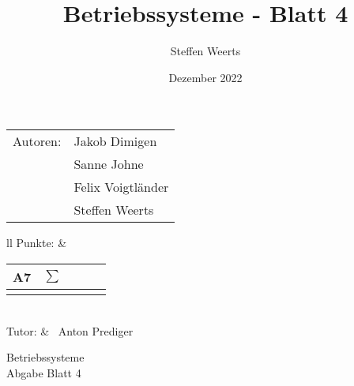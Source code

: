 \documentclass[12pt,a4paper,oneside,ngerman]{article}
\title{Betriebssysteme - Blatt 4}
\author{Steffen Weerts}
\date{Dezember 2022}
\newcommand{\fach}{Betriebssysteme}
\newcommand{\dokumentenTitel}{Abgabe Blatt 4}
\newcommand{\tutor}{Anton Prediger}
\newcommand{\memberOne}{Jakob Dimigen}
\newcommand{\memberTwo}{Sanne Johne}
\newcommand{\memberThree}{Felix Voigtl\"ander}
\newcommand{\memberFour}{Steffen Weerts}
\begin{document}
\thispagestyle{plain}

\begin{multicols}{2} %
		\hspace{-1cm} %
		\begin{tabular}{ll} %
			Autoren: & \memberOne \\ %
			& \memberTwo \\
			& \memberThree  \\
			& \memberFour \\ %
			 
		\end{tabular}
		
		\columnbreak %
		\hspace{-1cm} %
		\raggedleft \begin{tabular}{ll} %
			Punkte: &  
			\renewcommand{\arraystretch}{1.2} 
			\begin{tabular}{|p{0.8cm}|p{0.8cm}|p{0.8cm}|p{0.8cm}|p{0.8cm}|}
				\hline A7 & $\sum\limits^{ }$ \\ \hline
				& \\ \hline    
			\end{tabular} \\ Tutor: &  \ \tutor \\
		\end{tabular}
		
	\end{multicols} %
	
	\begin{center}
		\Large{\fach} \\
		\LARGE{\dokumentenTitel} \\
    \end{center}
\end{document}

